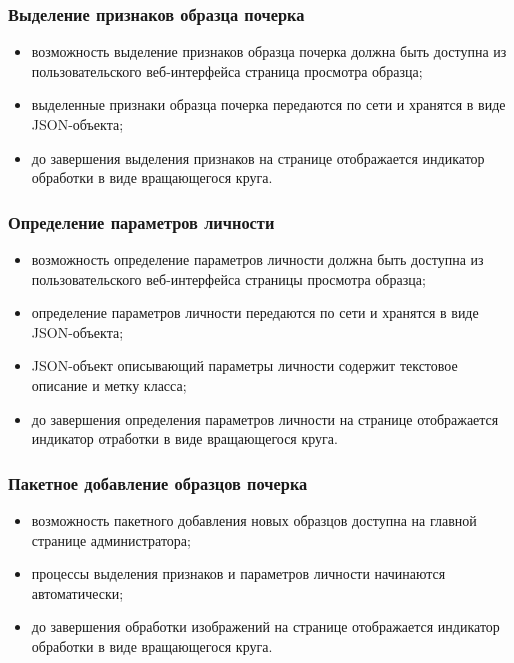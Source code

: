 \subsubsection{Выделение признаков образца почерка}
\label{sec:freq:extract_features}
\begin{itemize}
	\item возможность выделение признаков образца почерка должна быть доступна из пользовательского веб-интерфейса страница просмотра образца;
	\item выделенные признаки образца почерка передаются по сети и хранятся в виде JSON-объекта;
	\item до завершения выделения признаков на странице отображается индикатор обработки в виде вращающегося круга.
\end{itemize}

\subsubsection{Определение параметров личности}
\label{sec:freq:psiho_analysis}
\begin{itemize}
	\item возможность определение параметров личности должна быть доступна из пользовательского веб-интерфейса страницы просмотра образца;
	\item определение параметров личности передаются по сети и хранятся в виде JSON-объекта;
	\item JSON-объект описывающий параметры личности содержит текстовое описание и метку класса;
	\item до завершения определения параметров личности на странице отображается индикатор отработки в виде вращающегося круга.
\end{itemize}

\subsubsection{Пакетное добавление образцов почерка}
\label{sec:freq:package_add}
\begin{itemize}
	\item возможность пакетного добавления новых образцов доступна на главной странице администратора;
	\item процессы выделения признаков и параметров личности начинаются автоматически;
	\item до завершения обработки изображений на странице отображается индикатор обработки в виде вращающегося круга.
\end{itemize}

